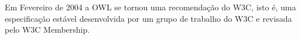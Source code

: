 Em Fevereiro de 2004 a OWL se tornou uma recomendação do W3C, isto é, uma especificação estável desenvolvida por um grupo de trabalho do W3C e revisada pelo W3C Membership.
















